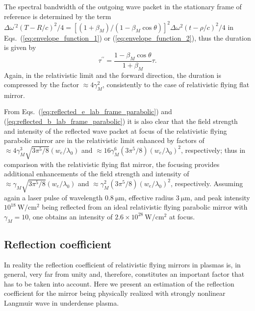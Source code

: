 \documentclass[10pt, a4paper, twoside, openright]{report}
\begin{document}
The spectral bandwidth of the outgoing wave packet in the stationary frame of reference is determined by the term $ \Delta \omega^{\prime 2} \left( T - R / c \right)^2 / 4 = \left[ \left( 1 + \beta_M \right) / \left( 1 - \beta_M \cos \theta \right) \right]^2 \Delta \omega^2 \left( t - \rho / c \right)^2 / 4 $ in Eqs.~(\ref{eq:envelope_function_1}) or (\ref{eq:envelope_function_2}), thus the duration is given by \cite{Jeong2021}
\begin{equation}\label{eq:compression_factor_parabolic}
	\tau^{\prime \prime} = \frac{1 - \beta_M \cos \theta}{1 + \beta_M} \tau.
\end{equation}
Again, in the relativistic limit and the forward direction, the duration is compressed by the factor $ \approx 4 \gamma_M^2 $, consistently to the case of relativistic flying flat mirror.

From Eqs.~(\ref{eq:reflected_e_lab_frame_parabolic}) and (\ref{eq:reflected_b_lab_frame_parabolic}) it is also clear that the field strength and intensity of the reflected wave packet at focus of the relativistic flying parabolic mirror are in the relativistic limit enhanced by factors of $ \approx 4 \gamma_M^3 \sqrt{3 \pi^5 / 8} \left( w_e / \lambda_0 \right) $ and $ \approx 16 \gamma_M^6 \left( 3 \pi^5 / 8 \right) \left( w_e / \lambda_0 \right)^2 $, respectively; thus in comparison with the relativistic flying flat mirror, the focusing provides additional enhancements of the field strength and intensity of $ \approx \gamma_M \sqrt{3 \pi^5 / 8} \left( w_e / \lambda_0 \right) $ and $ \approx \gamma_M^2 \left( 3 \pi^5 / 8 \right) \left( w_e / \lambda_0 \right)^2 $, respectively. Assuming again a laser pulse of wavelength $ 0.8 \ \mathrm{\mu m} $, effective radius $ 3 \ \mathrm{\mu m} $, and peak intensity $ 10^{18} \ \mathrm{W / cm^2} $ being reflected from an ideal relativistic flying parabolic mirror with $ \gamma_M = 10 $, one obtains an intensity of $ 2.6 \times 10^{28} \ \mathrm{W / cm^2} $ at focus.

\subsection{Reflection coefficient}


In reality the reflection coefficient of relativistic flying mirrors in plasmas is, in general, very far from unity and, therefore, constitutes an important factor that has to be taken into account. Here we present an estimation of the reflection coefficient for the mirror being physically realized with strongly nonlinear Langmuir wave in underdense plasma.
\end{document}
